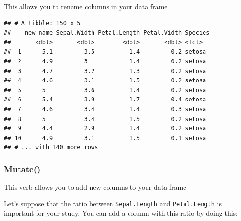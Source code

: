 \documentclass[
]{article}
\newenvironment{Shaded}{\begin{snugshade}}{\end{snugshade}}
\newcommand{\CommentTok}[1]{\textcolor[rgb]{0.56,0.35,0.01}{\textit{#1}}}
\newcommand{\DataTypeTok}[1]{\textcolor[rgb]{0.13,0.29,0.53}{#1}}
\newcommand{\KeywordTok}[1]{\textcolor[rgb]{0.13,0.29,0.53}{\textbf{#1}}}
\newcommand{\NormalTok}[1]{#1}
\newcommand{\OperatorTok}[1]{\textcolor[rgb]{0.81,0.36,0.00}{\textbf{#1}}}
\newcommand{\StringTok}[1]{\textcolor[rgb]{0.31,0.60,0.02}{#1}}
\begin{document}
This allows you to rename columns in your data frame

\begin{Shaded}
\end{Shaded}

\begin{verbatim}
## # A tibble: 150 x 5
##    new_name Sepal.Width Petal.Length Petal.Width Species
##       <dbl>       <dbl>        <dbl>       <dbl> <fct>  
##  1      5.1         3.5          1.4         0.2 setosa 
##  2      4.9         3            1.4         0.2 setosa 
##  3      4.7         3.2          1.3         0.2 setosa 
##  4      4.6         3.1          1.5         0.2 setosa 
##  5      5           3.6          1.4         0.2 setosa 
##  6      5.4         3.9          1.7         0.4 setosa 
##  7      4.6         3.4          1.4         0.3 setosa 
##  8      5           3.4          1.5         0.2 setosa 
##  9      4.4         2.9          1.4         0.2 setosa 
## 10      4.9         3.1          1.5         0.1 setosa 
## # ... with 140 more rows
\end{verbatim}

\hypertarget{mutate}{%
\subsubsection{Mutate()}\label{mutate}}

This verb allows you to add new columns to your data frame

Let's suppose that the ratio between \texttt{Sepal.Length} and
\texttt{Petal.Length} is important for your study. You can add a column
with this ratio by doing this:

\begin{Shaded}
\end{Shaded}
\end{document}

